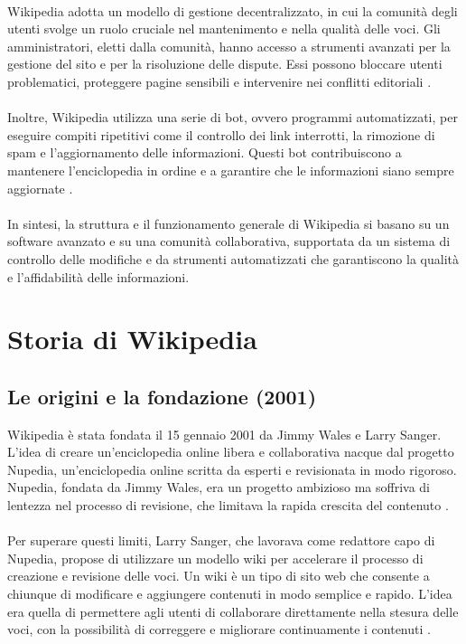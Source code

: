 \documentclass[12pt,a4paper]{report}
\begin{document}
\paragraph*{}
Wikipedia adotta un modello di gestione decentralizzato, in cui la comunità degli utenti svolge un ruolo cruciale nel mantenimento e nella qualità delle voci. Gli amministratori, eletti dalla comunità, hanno accesso a strumenti avanzati per la gestione del sito e per la risoluzione delle dispute. Essi possono bloccare utenti problematici, proteggere pagine sensibili e intervenire nei conflitti editoriali \cite{denning2005wikipedia}.
\paragraph*{}
Inoltre, Wikipedia utilizza una serie di bot, ovvero programmi automatizzati, per eseguire compiti ripetitivi come il controllo dei link interrotti, la rimozione di spam e l'aggiornamento delle informazioni. Questi bot contribuiscono a mantenere l'enciclopedia in ordine e a garantire che le informazioni siano sempre aggiornate \cite{history_of_wikis}.
\paragraph*{}
In sintesi, la struttura e il funzionamento generale di Wikipedia si basano su un software avanzato e su una comunità collaborativa, supportata da un sistema di controllo delle modifiche e da strumenti automatizzati che garantiscono la qualità e l'affidabilità delle informazioni.

\section{Storia di Wikipedia}
\subsection{Le origini e la fondazione (2001)}
Wikipedia è stata fondata il 15 gennaio 2001 da Jimmy Wales e Larry Sanger. L'idea di creare un'enciclopedia online libera e collaborativa nacque dal progetto Nupedia, un'enciclopedia online scritta da esperti e revisionata in modo rigoroso. Nupedia, fondata da Jimmy Wales, era un progetto ambizioso ma soffriva di lentezza nel processo di revisione, che limitava la rapida crescita del contenuto \cite{lih2009wikipedia}.
\paragraph*{}
Per superare questi limiti, Larry Sanger, che lavorava come redattore capo di Nupedia, propose di utilizzare un modello wiki per accelerare il processo di creazione e revisione delle voci. Un wiki è un tipo di sito web che consente a chiunque di modificare e aggiungere contenuti in modo semplice e rapido. L'idea era quella di permettere agli utenti di collaborare direttamente nella stesura delle voci, con la possibilità di correggere e migliorare continuamente i contenuti \cite{reagle2010good}.
\end{document}
